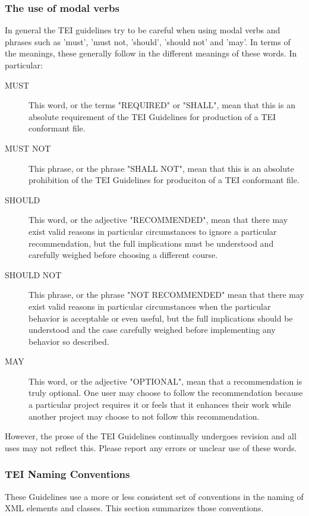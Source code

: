 \subsubsection[{The use of modal verbs}]{The use of modal verbs}\label{AB-modal}\par
In general the TEI guidelines try to be careful when using modal verbs and phrases such as 'must', 'must not, 'should', 'should not' and 'may'. In terms of the meanings, these generally follow  in the different meanings of these words. In particular: \begin{description}

\item[{MUST}]This word, or the terms "REQUIRED" or "SHALL", mean that this is an absolute requirement of the TEI Guidelines for production of a TEI conformant file.
\item[{MUST NOT}]This phrase, or the phrase "SHALL NOT", mean that this is an absolute prohibition of the TEI Guidelines for produciton of a TEI conformant file.
\item[{SHOULD}]This word, or the adjective "RECOMMENDED", mean that there may exist valid reasons in particular circumstances to ignore a particular recommendation, but the full implications must be understood and carefully weighed before choosing a different course.
\item[{SHOULD NOT}]This phrase, or the phrase "NOT RECOMMENDED" mean that there may exist valid reasons in particular circumstances when the particular behavior is acceptable or even useful, but the full implications should be understood and the case carefully weighed before implementing any behavior so described.
\item[{MAY}]This word, or the adjective "OPTIONAL", mean that a recommendation is truly optional. One user may choose to follow the recommendation because a particular project requires it or feels that it enhances their work while another project may choose to not follow this recommendation.
\end{description}  However, the prose of the TEI Guidelines continually undergoes revision and all uses may not reflect this. Please report any errors or unclear use of these words.
\subsubsection[{TEI Naming Conventions}]{TEI Naming Conventions}\label{AB-namecon}\par
These Guidelines use a more or less consistent set of conventions in the naming of XML elements and classes. This section summarizes those conventions.
